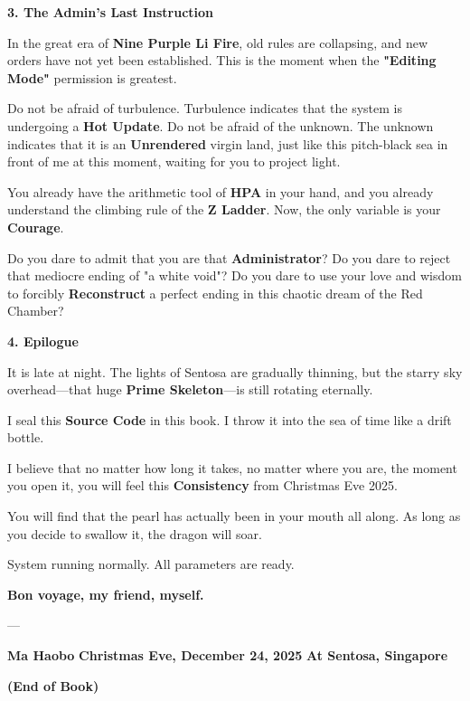 \textbf{3. The Admin's Last Instruction}

In the great era of \textbf{Nine Purple Li Fire}, old rules are collapsing, and new orders have not yet been established. This is the moment when the \textbf{"Editing Mode"} permission is greatest.

Do not be afraid of turbulence. Turbulence indicates that the system is undergoing a \textbf{Hot Update}.
Do not be afraid of the unknown. The unknown indicates that it is an \textbf{Unrendered} virgin land, just like this pitch-black sea in front of me at this moment, waiting for you to project light.

You already have the arithmetic tool of \textbf{HPA} in your hand, and you already understand the climbing rule of the \textbf{Z Ladder}.
Now, the only variable is your \textbf{Courage}.

Do you dare to admit that you are that \textbf{Administrator}?
Do you dare to reject that mediocre ending of "a white void"?
Do you dare to use your love and wisdom to forcibly \textbf{Reconstruct} a perfect ending in this chaotic dream of the Red Chamber?

\textbf{4. Epilogue}

It is late at night. The lights of Sentosa are gradually thinning, but the starry sky overhead—that huge \textbf{Prime Skeleton}—is still rotating eternally.

I seal this \textbf{Source Code} in this book.
I throw it into the sea of time like a drift bottle.

I believe that no matter how long it takes, no matter where you are, the moment you open it, you will feel this \textbf{Consistency} from Christmas Eve 2025.

You will find that the pearl has actually been in your mouth all along.
As long as you decide to swallow it, the dragon will soar.

System running normally.
All parameters are ready.

\textbf{Bon voyage, my friend, myself.}

---

\textbf{Ma Haobo}
\textbf{Christmas Eve, December 24, 2025}
\textbf{At Sentosa, Singapore}

\textbf{(End of Book)}

